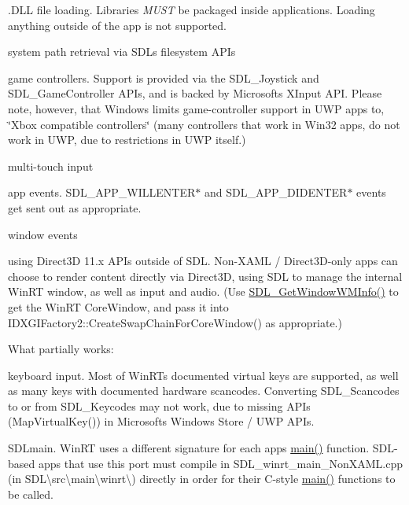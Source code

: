 \begin{DoxyItemize}
\begin{DoxyItemize}
\item .D\+LL file loading. Libraries {\itshape M\+U\+ST} be packaged inside applications. Loading anything outside of the app is not supported.
\item system path retrieval via S\+DL\textquotesingle{}s filesystem A\+P\+Is
\item game controllers. Support is provided via the S\+D\+L\+\_\+\+Joystick and S\+D\+L\+\_\+\+Game\+Controller A\+P\+Is, and is backed by Microsoft\textquotesingle{}s X\+Input A\+PI. Please note, however, that Windows limits game-\/controller support in U\+WP apps to, \char`\"{}\+Xbox compatible controllers\char`\"{} (many controllers that work in Win32 apps, do not work in U\+WP, due to restrictions in U\+WP itself.)
\item multi-\/touch input
\item app events. S\+D\+L\+\_\+\+A\+P\+P\+\_\+\+W\+I\+L\+L\+E\+N\+T\+E\+R$\ast$ and S\+D\+L\+\_\+\+A\+P\+P\+\_\+\+D\+I\+D\+E\+N\+T\+E\+R$\ast$ events get sent out as appropriate.
\item window events
\item using Direct3D 11.\+x A\+P\+Is outside of S\+DL. Non-\/\+X\+A\+ML / Direct3\+D-\/only apps can choose to render content directly via Direct3D, using S\+DL to manage the internal Win\+RT window, as well as input and audio. (Use \mbox{\hyperlink{_s_d_l__syswm_8h_ad6e40121a96c88af20d9469a04706fef}{S\+D\+L\+\_\+\+Get\+Window\+W\+M\+Info()}} to get the Win\+RT \textquotesingle{}Core\+Window\textquotesingle{}, and pass it into I\+D\+X\+G\+I\+Factory2\+::\+Create\+Swap\+Chain\+For\+Core\+Window() as appropriate.)
\end{DoxyItemize}
\item What partially works\+:
\begin{DoxyItemize}
\item keyboard input. Most of Win\+RT\textquotesingle{}s documented virtual keys are supported, as well as many keys with documented hardware scancodes. Converting S\+D\+L\+\_\+\+Scancodes to or from S\+D\+L\+\_\+\+Keycodes may not work, due to missing A\+P\+Is (Map\+Virtual\+Key()) in Microsoft\textquotesingle{}s Windows Store / U\+WP A\+P\+Is.
\item S\+D\+Lmain. Win\+RT uses a different signature for each app\textquotesingle{}s \mbox{\hyperlink{_c_make_c_compiler_id_8c_a0ddf1224851353fc92bfbff6f499fa97}{main()}} function. S\+D\+L-\/based apps that use this port must compile in S\+D\+L\+\_\+winrt\+\_\+main\+\_\+\+Non\+X\+A\+M\+L.\+cpp (in {\ttfamily S\+DL\textbackslash{}src\textbackslash{}main\textbackslash{}winrt\textbackslash{}}) directly in order for their C-\/style \mbox{\hyperlink{_c_make_c_compiler_id_8c_a0ddf1224851353fc92bfbff6f499fa97}{main()}} functions to be called.

\end{DoxyItemize}
\end{DoxyItemize}
